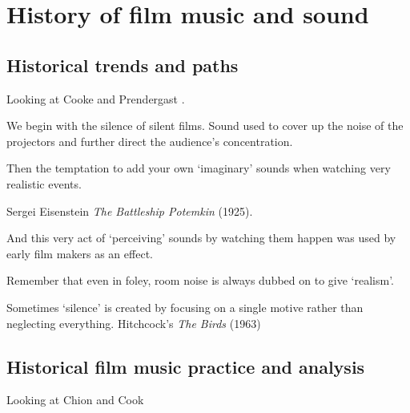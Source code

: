 
\chapter{History of film music and sound}
\label{history}

\section{Historical trends and paths}
Looking at Cooke \citeyearpar{cooke2008history} and Prendergast \citeyearpar{prendergast1992film}.

We  begin with the silence of silent films.  
Sound used to cover up the noise of the projectors and further direct the audience's concentration.

Then the temptation to add your own `imaginary' sounds when watching very realistic events. 

Sergei Eisenstein \textit{The Battleship Potemkin} (1925). 

And this very act of `perceiving' sounds by watching them happen was used by early film makers as an effect. 

Remember that even in foley, room noise is always dubbed on to give `realism'.

Sometimes `silence' is created by focusing on a single motive rather than neglecting everything. Hitchcock's \textit{The Birds} (1963) 

\section{Historical film music practice and analysis}

Looking at Chion \citeyearpar{chion1990} and Cook \citeyearpar{cook1998analysing}

